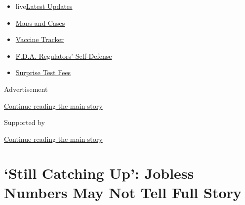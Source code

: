 \begin{itemize}
\tightlist
\item
  live\href{https://www.nytimes3xbfgragh.onion/2020/09/12/world/covid-19-coronavirus.html?name=styln-coronavirus-markets\&region=TOP_BANNER\&block=storyline_menu_recirc\&action=click\&pgtype=Article\&impression_id=b852b430-f52e-11ea-bd61-6d19986efa33\&variant=undefined}{Latest
  Updates}
\item
  \href{https://www.nytimes3xbfgragh.onion/interactive/2020/us/coronavirus-us-cases.html?name=styln-coronavirus-markets\&region=TOP_BANNER\&block=storyline_menu_recirc\&action=click\&pgtype=Article\&impression_id=b852b431-f52e-11ea-bd61-6d19986efa33\&variant=undefined}{Maps
  and Cases}
\item
  \href{https://www.nytimes3xbfgragh.onion/interactive/2020/science/coronavirus-vaccine-tracker.html?name=styln-coronavirus-markets\&region=TOP_BANNER\&block=storyline_menu_recirc\&action=click\&pgtype=Article\&impression_id=b852b432-f52e-11ea-bd61-6d19986efa33\&variant=undefined}{Vaccine
  Tracker}
\item
  \href{https://www.nytimes3xbfgragh.onion/2020/09/10/us/politics/fda-coronavirus-vaccine.html?name=styln-coronavirus-markets\&region=TOP_BANNER\&block=storyline_menu_recirc\&action=click\&pgtype=Article\&impression_id=b852b433-f52e-11ea-bd61-6d19986efa33\&variant=undefined}{F.D.A.
  Regulators' Self-Defense}
\item
  \href{https://www.nytimes3xbfgragh.onion/2020/09/09/upshot/coronavirus-surprise-test-fees.html?name=styln-coronavirus-markets\&region=TOP_BANNER\&block=storyline_menu_recirc\&action=click\&pgtype=Article\&impression_id=b852b434-f52e-11ea-bd61-6d19986efa33\&variant=undefined}{Surprise
  Test Fees}
\end{itemize}

Advertisement

\protect\hyperlink{after-top}{Continue reading the main story}

Supported by

\protect\hyperlink{after-sponsor}{Continue reading the main story}

\hypertarget{still-catching-up-jobless-numbers-may-not-tell-full-story}{%
\section{`Still Catching Up': Jobless Numbers May Not Tell Full
Story}\label{still-catching-up-jobless-numbers-may-not-tell-full-story}}

